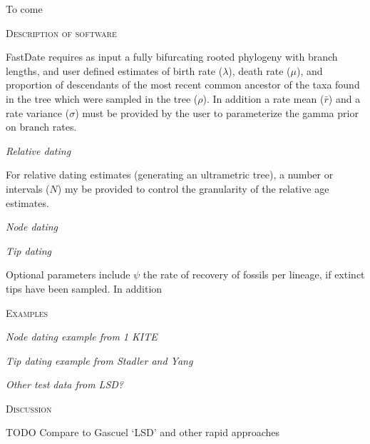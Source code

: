 \documentclass{llncs}
\renewcommand{\section}[1]{%
\bigskip
\begin{center}
\begin{Large}
\normalfont\scshape #1
\medskip
\end{Large}
\end{center}}
\renewcommand{\subsection}[1]{%
\bigskip
\begin{center}
\begin{large}
\normalfont\itshape #1
\end{large}
\end{center}}
\begin{document}
To come

\section{Description of software}
FastDate requires as input a fully bifurcating rooted phylogeny with branch lengths,
and user defined estimates of birth rate ($\lambda$), death rate ($\mu$), 
and proportion of descendants of the most recent common ancestor of the taxa found in the tree
which were sampled in the tree ($\rho$).
In addition a rate mean ($\bar{r}$) and a rate variance ($\sigma$) must be provided by the user
to parameterize the gamma prior on branch rates.


\subsection{Relative dating}
For relative dating estimates (generating an ultrametric tree),
a number or intervals ($N$) my be provided to control the granularity of 
the relative age estimates.


\subsection{Node dating}

\subsection{Tip dating}
Optional parameters include $\psi$ the rate of recovery of fossils per lineage, 
if extinct tips have been sampled.
In addition


\section{Examples}
\subsection{Node dating example from 1 KITE}

\subsection{Tip dating example from Stadler and Yang}

\subsection{Other test data from LSD?}

\section{Discussion}

TODO Compare to Gascuel `LSD' and other rapid approaches





\end{document}
